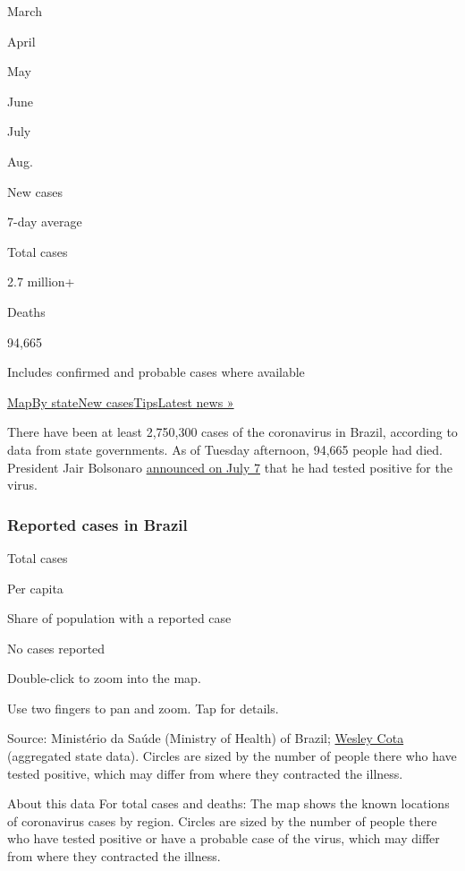March

April

May

June

July

Aug.

New cases

7-day average

Total cases

2.7 million+

Deaths

94,665

Includes confirmed and probable cases where available

\protect\hyperlink{map}{Map}\protect\hyperlink{states}{By
state}\protect\hyperlink{cases}{New
cases}\protect\hyperlink{tips}{Tips}\href{https://www.nytimes3xbfgragh.onion/2020/08/04/world/coronavirus-covid-19.html}{Latest
news »}

There have been at least 2,750,300 cases of the coronavirus in Brazil,
according to data from state governments. As of Tuesday afternoon,
94,665 people had died. President Jair Bolsonaro
\href{https://www.nytimes3xbfgragh.onion/2020/07/07/world/americas/brazil-bolsonaro-coronavirus.html}{announced
on July 7} that he had tested positive for the virus.

\hypertarget{reported-cases-in-brazil}{%
\subsubsection{Reported cases in
Brazil}\label{reported-cases-in-brazil}}

Total cases

Per capita

Share of population with a reported case

No cases reported

Double-click to zoom into the map.

Use two fingers to pan and zoom. Tap for details.

Source: Ministério da Saúde (Ministry of Health) of Brazil;
\href{https://github.com/wcota/covid19br}{Wesley Cota} (aggregated state
data). Circles are sized by the number of people there who have tested
positive, which may differ from where they contracted the illness.

About this data For total cases and deaths: The map shows the known
locations of coronavirus cases by region. Circles are sized by the
number of people there who have tested positive or have a probable case
of the virus, which may differ from where they contracted the illness.

